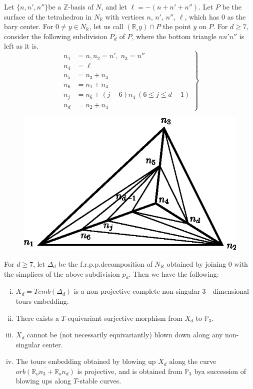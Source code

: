 Let $\{n, n', n''\}$\pageoriginale be a $\mathbb{Z}$-basis of $N$, and
let $\ell = -(n + n' + n'')$. Let $P$ be the surface of the
tetrahedron in $N_{\mathbb{R}}$ with vertices $n$, $n'$, $n''$, $\ell$, which has
0 as the bary center. For $0 \neq y\in N_{\mathbb{R}}$, let us call
$(\mathbb{R}_\circ y)\cap P$
the point $y$ on $P$. For $d\ge 7$, consider the following subdivision 
$P_d$ of $P$, where the bottom triangle $nn'n''$ is left as it is.  
\begin{equation*}
\left. 
\begin{aligned}
n_1 & = n,n_2 = n', \; n_3 = n''\\
n_4 & = \ell\\
n_5 & = n_3 + n_4\\
n_6 & = n_1 + n_4\\
n_j & = n_6 + (j-6)n_4 ~(6 \le j \le d-1)\\
n_d & = n_2 + n_4
\end{aligned}
 \right\}
\end{equation*}

\begin{figure}[H]
\centering 
\includegraphics{vol58-fig/fig58-26.eps} 
\end{figure}

\begin{prop}\label{chap1:prop9.4}%
For $d \ge 7$, let $\Delta_d$ be the f.r.p.p.decomposition of $N_R$
obtained by joining $0$ with the simplices of the above subdivision
$p_d$. Then we have the following: 
\begin{enumerate}[(i)]
\item $X_d=Temb (\Delta_d)$ is a non-projective complete non-singular
  3 - dimensional tours embedding. 

\item There exists a $T$-equivariant surjective morphism from $X_d$ to
  $\mathbb{P}_3$. 

\item $X_d$ cannot be (not necessarily equivariantly) blown down along
  any non-singular center. 

\item The tours embedding obtained by blowing up $X_d$ along the curve
  $\overline{orb(\mathbb{R}_on_3+ \mathbb{R}_on_d)}$ is projective,
  and is obtained from $\mathbb{P}_3$ by\pageoriginale a succession of
  blowing ups along $T$-stable curves.  
\end{enumerate}
\end{prop}

